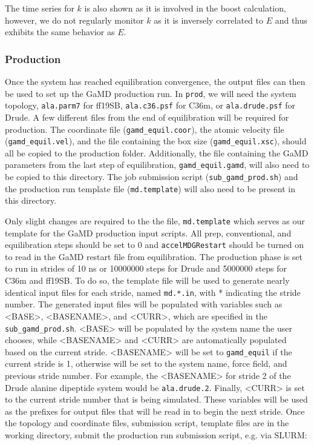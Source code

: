 \documentclass[9pt,tutorial,pubversion]{livecoms}
\begin{document}
The time series for $k$ is also shown as it is involved in the boost calculation, however, we do not regularly monitor $k$ as it is inversely correlated to $E$ and thus exhibits the same behavior as $E$.

\subsubsection{Production} \label{ss:tutorial_prod}
Once the system has reached equilibration convergence, the output files can then be used to set up the GaMD production run. In \texttt{prod}, we will need the system topology, \texttt{ala.parm7} for ff19SB, \texttt{ala.c36.psf} for C36m, or \texttt{ala.drude.psf} for Drude. A few different files from the end of equilibration will be required for production. The coordinate file (\texttt{gamd\_equil.coor}), the atomic velocity file (\texttt{gamd\_equil.vel}), and the file containing the box size (\texttt{gamd\_equil.xsc}), should all be copied to the production folder. Additionally, the file containing the GaMD parameters from the last step of equilibration, \texttt{gamd\_equil.gamd}, will also need to be copied to this directory. The job submission script  (\texttt{sub\_gamd\_prod.sh}) and the production run template file (\texttt{md.template}) will also need to be present in this directory. 

Only slight changes are required to the the file, \texttt{md.template} which serves as our template for the GaMD production input scripts. All prep, conventional, and equilibration steps should be set to 0 and \texttt{accelMDGRestart} should be turned on to read in the GaMD restart file from equilibration. The production phase is set to run in strides of 10 ns or 10000000 steps for Drude and 5000000 steps for C36m and ff19SB. To do so, the template file will be used to generate nearly identical input files for each stride, named \texttt{md.*.in}, with * indicating the stride number. The generated input files will be populated with variables such as <BASE>, <BASENAME>, and <CURR>, which are specified in the \texttt{sub\_gamd\_prod.sh}. <BASE> will be populated by the system name the user chooses, while <BASENAME> and <CURR> are automatically populated based on the current stride. <BASENAME> will be set to \texttt{gamd\_equil} if the current stride is 1, otherwise will be set to the system name, force field, and previous stride number. For example, the <BASENAME> for stride 2 of the Drude alanine dipeptide system would be \texttt{ala.drude.2}. Finally, <CURR> is set to the current stride number that is being simulated. These variables will be used as the prefixes for output files that will be read in to begin the next stride. Once the topology and coordinate files, submission script,  template files are in the working directory, submit the production run submission script, e.g. via SLURM:
\end{document}
